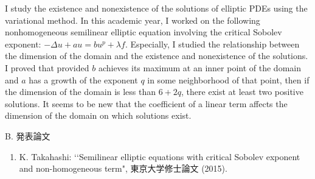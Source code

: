 \documentclass[a4j,twocolumn]{jarticle}
\begin{document}
\vspace{0.5cm}

I study the existence and nonexistence of the solutions
of elliptic PDEs using the variational method.
In this academic year, I worked on the following
nonhomogeneous semilinear elliptic equation
involving the critical Sobolev exponent:
$-\Delta u + a u = b u^p + \lambda f$. Especially, I studied
the relationship between the dimension of the domain and
the existence and nonexistence of the solutions.
I proved that provided 
$b$ achieves its maximum at an inner point of the
domain and $a$ has a growth of the exponent $q$
in some neighborhood of that point, then
if the dimension of the domain is less than $6 + 2q$,
there exist at least two positive solutions.
It seems to be new that the coefficient of a linear term affects
the dimension of the domain on which solutions exist.

\vspace{0.2cm}


\noindent
B. 発表論文

\vspace{0.1cm}

\begin{enumerate}
\item K. Takahashi: \lq\lq Semilinear elliptic equations with critical
      Sobolev exponent and non-homogeneous term",
      東京大学修士論文 (2015).
\end{enumerate}
\end{document}
